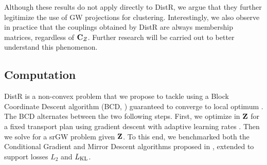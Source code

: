 Although these results do not apply directly to DistR, we argue that they further legitimize the use of GW projections for clustering. Interestingly, we also observe in practice that the couplings obtained by DistR are always membership matrices, regardless of ${\mathbf{C}}_{Z}$. Further research will be carried out to better understand this phenomenon. 


\subsection{Computation}\label{sec:computation_GW}

DistR is a non-convex problem that we propose to tackle using a Block Coordinate Descent algorithm (BCD, \citealt{tseng2001convergence}) guaranteed to converge to local optimum \cite{grippo2000convergence, Lyu2023bmm}. The BCD alternates between the two following steps. First, we optimize in ${\mathbf{Z}}$ for a fixed transport plan using gradient descent with adaptive learning rates \cite{kingma2014adam}. Then we solve for a srGW problem given ${\mathbf{Z}}$. To this end, we benchmarked both the Conditional Gradient and Mirror Descent algorithms proposed in \citet{vincent2021semi}, extended to support losses $L_2$ and $L_{\operatorname{KL}}$.

